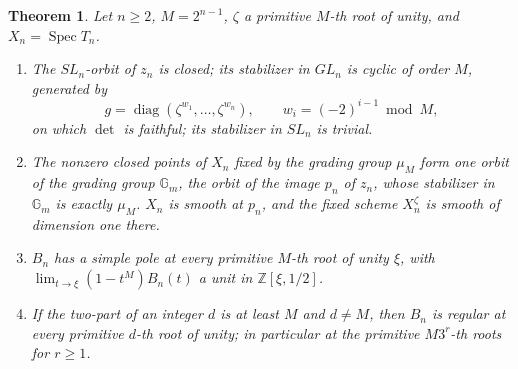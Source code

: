 \documentclass[11pt,a4paper]{article}
\newtheorem{theorem}{Theorem}[section]
\theoremstyle{definition}
\newcommand{\Z}{\mathbb{Z}}
\newcommand{\Gm}{\mathbb{G}_m}
\newcommand{\Spec}{\operatorname{Spec}}
\newcommand{\diag}{\operatorname{diag}}
\begin{document}
\begin{theorem}\label{thm:K024}
Let $n\ge2$, $M=2^{n-1}$, $\zeta$ a primitive $M$-th root of unity, and
$X_n=\Spec T_n$.
\begin{enumerate}
\item The $SL_n$-orbit of $z_n$ is closed; its stabilizer in $GL_n$ is cyclic of
order $M$, generated by
\begin{equation}\label{eq:chainelement}
 g=\diag(\zeta^{w_1},\dots,\zeta^{w_n}),\qquad w_i=(-2)^{i-1}\bmod M ,
\end{equation}
on which $\det$ is faithful; its stabilizer in $SL_n$ is trivial.
\item The nonzero closed points of $X_n$ fixed by the grading group $\mu_M$
form one orbit of the grading group $\Gm$, the orbit of the image $p_n$ of
$z_n$, whose stabilizer in $\Gm$ is exactly $\mu_M$. $X_n$ is smooth at $p_n$,
and the fixed scheme $X_n^{\zeta}$ is smooth of dimension one there.
\item $B_n$ has a simple pole at every primitive $M$-th root of unity $\xi$,
with $\lim_{t\to\xi}(1-t^M)B_n(t)$ a unit in $\Z[\xi,1/2]$.
\item If the two-part of an integer $d$ is at least $M$ and $d\ne M$, then
$B_n$ is regular at every primitive $d$-th root of unity; in particular at the
primitive $M3^r$-th roots for $r\ge1$.
\end{enumerate}
\end{theorem}
\end{document}
